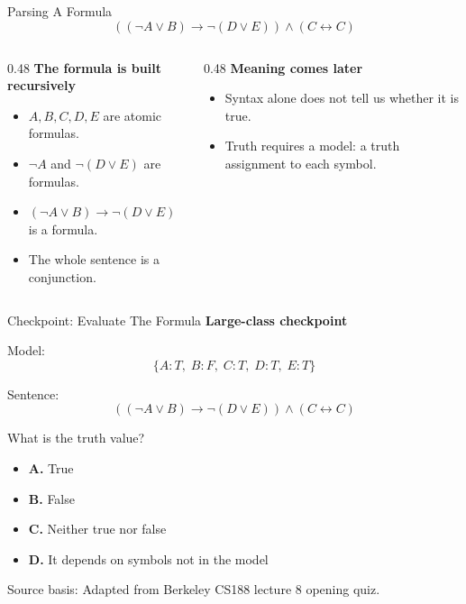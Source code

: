 \documentclass[aspectratio=169,11pt]{beamer}
\newcommand{\minihead}[1]{\textbf{\color{unswblue}#1}}
\newcommand{\activity}{\textbf{\color{unsworange}Large-class checkpoint}}
\newcommand{\choice}[2]{\textbf{#1.} #2}
\newcommand{\source}[1]{\vfill{\scriptsize\color{darkgrey}Source basis: #1}}
\newcommand{\model}[1]{\{#1\}}
\begin{document}
\begin{frame}{Parsing A Formula}
  \[
    ((\neg A \lor B) \rightarrow \neg(D \lor E)) \land (C \leftrightarrow C)
  \]

  \begin{columns}[T,onlytextwidth]
    \begin{column}{0.48\textwidth}
      \minihead{The formula is built recursively}
      \begin{itemize}
        \item $A,B,C,D,E$ are atomic formulas.
        \item $\neg A$ and $\neg(D \lor E)$ are formulas.
        \item $(\neg A \lor B) \rightarrow \neg(D \lor E)$ is a formula.
        \item The whole sentence is a conjunction.
      \end{itemize}
    \end{column}
    \begin{column}{0.48\textwidth}
      \minihead{Meaning comes later}
      \begin{itemize}
        \item Syntax alone does not tell us whether it is true.
        \item Truth requires a model: a truth assignment to each symbol.
      \end{itemize}
    \end{column}
  \end{columns}
\end{frame}

\begin{frame}{Checkpoint: Evaluate The Formula}
  \activity

  \vspace{0.6em}
  Model:
  \[
    \model{A:T,\;B:F,\;C:T,\;D:T,\;E:T}
  \]

  Sentence:
  \[
    ((\neg A \lor B) \rightarrow \neg(D \lor E)) \land (C \leftrightarrow C)
  \]

  What is the truth value?

  \begin{itemize}
    \item \choice{A}{True}
    \item \choice{B}{False}
    \item \choice{C}{Neither true nor false}
    \item \choice{D}{It depends on symbols not in the model}
  \end{itemize}

  \source{Adapted from Berkeley CS188 lecture 8 opening quiz.}
\end{frame}
\end{document}

